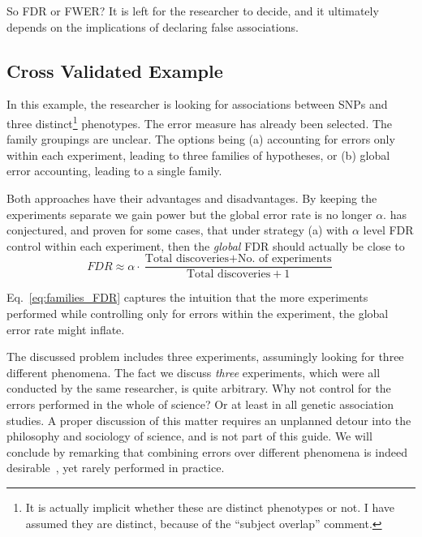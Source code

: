 \documentclass[review,12pt]{article}
\theoremstyle{definition}
\begin{document}
So FDR or FWER? It is left for the researcher to decide, and it ultimately depends on the implications of declaring false associations. 





\subsection{\label{sec:cross_validated}Cross Validated Example}

In this example, the researcher is looking for associations between SNPs and three distinct\footnote{ It is actually implicit whether these are distinct phenotypes or not. I have assumed they are distinct, because of the ``subject overlap'' comment.} phenotypes. The error measure has already been selected. The family groupings are unclear. 
The options being (a) accounting for errors only within each experiment, leading to three families of hypotheses, or (b) global error accounting, leading to a single family. 

Both approaches have their advantages and disadvantages. 
By keeping the experiments separate we gain power but the global error rate is no longer $\alpha$. \citet{yekutieli_hierarchical_2008} has conjectured, and proven for some cases, that under strategy (a) with $\alpha$ level FDR control within each experiment, then the \emph{global} FDR should actually be close to 
\begin{equation} 
	FDR \approx \alpha \cdot \frac{\text{Total discoveries} + 
	\text{No. of experiments}}{\text{Total discoveries}+1} \label{eq:families_FDR}
\end{equation}

Eq.~\ref{eq:families_FDR} captures the intuition that the more experiments performed while controlling only for errors within the experiment, the global error rate might inflate. 

The discussed problem includes three experiments, assumingly looking for three different phenomena. The fact we discuss \emph{three} experiments, which were all conducted by the same researcher, is quite arbitrary. Why not control for the errors performed in the whole of science? Or at least in all genetic association studies. 
A proper discussion of this matter requires an unplanned detour into the philosophy and sociology of science, and is not part of this guide. 
We will conclude by remarking that combining errors over different phenomena is indeed  desirable~\cite{ioannidis_why_2005}, yet rarely performed in practice. 
\end{document}
